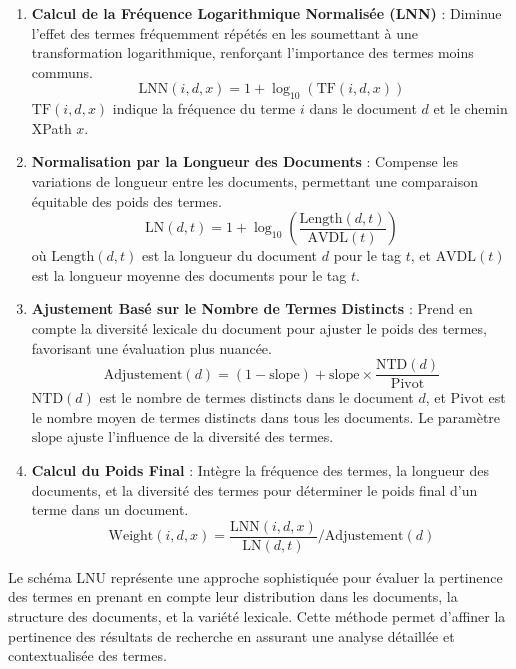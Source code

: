 \documentclass[a4paper, 12pt]{article}
\begin{document}
\begin{enumerate}
\item \textbf{Calcul de la Fréquence Logarithmique Normalisée (LNN)} : Diminue l'effet des termes fréquemment répétés en les soumettant à une transformation logarithmique, renforçant l'importance des termes moins communs.
\begin{equation}
\text{LNN}(i, d, x) = 1 + \log_{10}(\text{TF}(i, d, x))
\end{equation}
$\text{TF}(i, d, x)$ indique la fréquence du terme $i$ dans le document $d$ et le chemin XPath $x$.

\item \textbf{Normalisation par la Longueur des Documents} : Compense les variations de longueur entre les documents, permettant une comparaison équitable des poids des termes.
\begin{equation}
\text{LN}(d, t) = 1 + \log_{10}\left(\frac{\text{Length}(d, t)}{\text{AVDL}(t)}\right)
\end{equation}
où $\text{Length}(d, t)$ est la longueur du document $d$ pour le tag $t$, et $\text{AVDL}(t)$ est la longueur moyenne des documents pour le tag $t$.

\item \textbf{Ajustement Basé sur le Nombre de Termes Distincts} : Prend en compte la diversité lexicale du document pour ajuster le poids des termes, favorisant une évaluation plus nuancée.
\begin{equation}
\text{Adjustement}(d) = (1 - \text{slope}) + \text{slope} \times \frac{\text{NTD}(d)}{\text{Pivot}}
\end{equation}
$\text{NTD}(d)$ est le nombre de termes distincts dans le document $d$, et $\text{Pivot}$ est le nombre moyen de termes distincts dans tous les documents. Le paramètre $\text{slope}$ ajuste l'influence de la diversité des termes.

\item \textbf{Calcul du Poids Final} : Intègre la fréquence des termes, la longueur des documents, et la diversité des termes pour déterminer le poids final d'un terme dans un document.
\begin{equation}
\text{Weight}(i, d, x) = \frac{\text{LNN}(i, d, x)}{\text{LN}(d, t)} / \text{Adjustement}(d)
\end{equation}
\end{enumerate}

Le schéma LNU représente une approche sophistiquée pour évaluer la pertinence des termes en prenant en compte leur distribution dans les documents, la structure des documents, et la variété lexicale. Cette méthode permet d'affiner la pertinence des résultats de recherche en assurant une analyse détaillée et contextualisée des termes.
\end{document}
